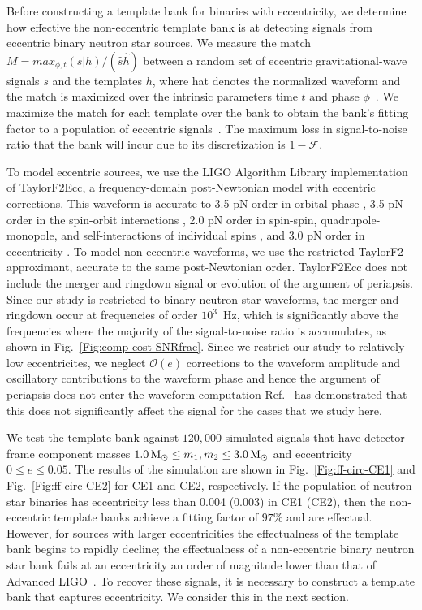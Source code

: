 Before constructing a template bank for binaries with eccentricity, we determine how effective the non-eccentric template bank is at detecting signals from eccentric binary neutron star sources. We measure the match $M = max_{\phi, t}(s|h)/(\hat{s}\hat{h})$ between a random set of eccentric gravitational-wave signals $s$ and the templates $h$, where hat denotes the normalized waveform and the match is maximized over the intrinsic parameters time $t$ and phase $\phi$~\cite{Finn:2000hj,Allen:2005fk}. We maximize the match for each template over the bank to obtain the bank’s fitting factor to a population of eccentric signals~\cite{Apostolatos:1995pj}. The maximum loss in signal-to-noise ratio that the bank will incur due to its discretization is $1-\mathcal{F}$. 

To model eccentric sources, we use the LIGO Algorithm Library implementation \cite{lalsuite} of TaylorF2Ecc, a frequency-domain post-Newtonian model with eccentric corrections. This waveform is accurate to 3.5 pN order in orbital phase \cite{Buonanno:2009zt}, 3.5 pN order in the spin-orbit interactions \cite{Bohe:2013cla}, 2.0 pN order in spin-spin, quadrupole-monopole, and self-interactions of individual spins \cite{Mikoczi:2005dn,Arun:2008kb}, and 3.0 pN order in eccentricity \cite{Moore:2016qxz}. To model non-eccentric waveforms, we use the restricted TaylorF2 approximant, accurate to the same post-Newtonian order. TaylorF2Ecc  does not include the merger and ringdown signal or evolution of the argument of periapsis. Since our study is restricted to binary neutron star waveforms, the merger and ringdown occur at frequencies of order $10^3$~Hz, which is significantly above the frequencies where the majority of the signal-to-noise ratio is accumulates, as shown in Fig.~\ref{Fig:comp-cost-SNRfrac}. Since we restrict our study to relatively low eccentricites, we neglect $\mathcal{O}(e)$ corrections to the waveform amplitude and oscillatory contributions to the waveform phase and hence the argument of periapsis does not enter the waveform computation Ref.~\cite{Moore:2016qxz} has demonstrated that this does not significantly affect the signal for the cases that we study here.

We test the template bank against $120,000$ simulated signals that have detector-frame component masses $1.0\,\mathrm{M}_{\odot} \leq m_1,m_2 \leq 3.0\,\mathrm{M}_{\odot}$ and eccentricity $0 \le e \le 0.05$. The results of the simulation are shown in Fig.~\ref{Fig:ff-circ-CE1} and Fig.~\ref{Fig:ff-circ-CE2} for CE1 and CE2, respectively. If the population of neutron star binaries has eccentricity less than 0.004 (0.003) in CE1 (CE2), then the non-eccentric template banks achieve a fitting factor of $97\%$ and are effectual. However, for sources with larger eccentricities the effectualness of the template bank begins to rapidly decline; the effectualness of a non-eccentric binary neutron star bank fails at an eccentricity an order of magnitude lower than that of Advanced LIGO~\cite{Brown:2009ng, Huerta:2013qb}. To recover these signals, it is necessary to construct a template bank that captures eccentricity. We consider this in the next section.


